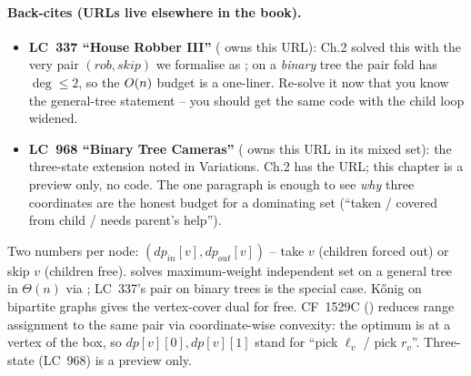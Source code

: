 \paragraph{Back-cites (URLs live elsewhere in the book).}
\begin{itemize}[nosep,leftmargin=1.4em]
  \item \textbf{LC~337 ``House Robber III''} ( owns this URL):
        Ch.2 solved this with the very pair $(\mathit{rob},\mathit{skip})$
        we formalise as ; on a \emph{binary} tree the
        pair fold has $\deg\le 2$, so the $O(n)$ budget is a one-liner.
        Re-solve it now that you know the general-tree statement -- you
        should get the same code with the child loop widened.
  \item \textbf{LC~968 ``Binary Tree Cameras''} ( owns this
        URL in its mixed set): the three-state extension noted in
        Variations. Ch.2 has the URL; this chapter is a preview only, no
        code. The one paragraph is enough to see \emph{why} three
        coordinates are the honest budget for a dominating set (``taken
        / covered from child / needs parent's help'').
\end{itemize}

\begin{recallbox}
Two numbers per node: $(\mathit{dp}_{\mathit{in}}[v],\mathit{dp}_{\mathit{out}}[v])$
-- take $v$ (children forced out) or skip $v$ (children free).
 solves maximum-weight independent set on a general
tree in $\Theta(n)$ via ; LC~337's pair on binary trees
is the special case. K{\H{o}}nig on bipartite graphs gives the vertex-cover
dual for free. CF~1529C () reduces range
assignment to the same pair via coordinate-wise convexity: the optimum is
at a vertex of the box, so $\mathit{dp}[v][0],\mathit{dp}[v][1]$ stand for
``pick $\ell_v$ / pick $r_v$''. Three-state (LC~968) is a preview only.
\end{recallbox}
